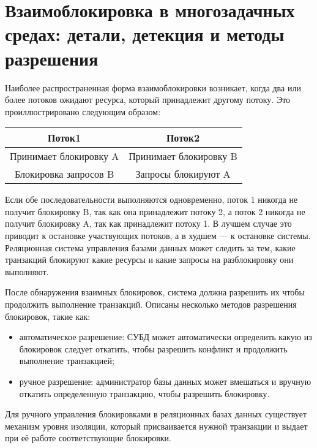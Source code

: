 \chapter{Взаимоблокировка в многозадачных средах: детали, детекция и методы разрешения}

Наиболее распространенная форма взаимоблокировки возникает, когда два или более потоков ожидают ресурса, который принадлежит другому потоку\cite{deadlock_detection}. Это проиллюстрировано следующим образом:
\FloatBarrier
\begin{table}[h]
	\renewcommand{\arraystretch}{1.8}
	\renewcommand{\tabcolsep}{0.1cm} 
	\begin{center}
		\begin{tabular}{|c|c|} 
			\hline
			Поток1 & Поток2 \\
			\hline
			Принимает блокировку A & Принимает блокировку B \\
			\hline 
			Блокировка запросов B & Запросы блокируют A \\
			\hline
		\end{tabular}
	\end{center}
\end{table}
\FloatBarrier
Если обе последовательности выполняются одновременно, поток 1 никогда не получит блокировку B, так как она принадлежит потоку 2, а поток 2 никогда не получит блокировку A, так как принадлежит потоку 1. В лучшем случае это приводит к остановке участвующих потоков, а в худшем — к остановке системы.
Реляционная система управления базами данных может следить за тем, какие транзакций блокируют какие ресурсы и какие запросы на разблокировку они выполняют.

После обнаружения взаимных блокировок, система должна разрешить их чтобы продолжить выполнение транзакций. Описаны несколько методов разрешения блокировок, такие как:
\begin{itemize}
	\item автоматическое разрешение: СУБД может автоматически определить какую из блокировок следует откатить, чтобы разрешить конфликт и продолжить выполнение транзакцией;
	\item ручное разрешение: администратор базы данных может вмешаться и вручную откатить определенную транзакцию, чтобы разрешить блокировку.
\end{itemize}

Для ручного управления блокировками в реляционных базах данных существует механизм уровня изоляции, который присваивается нужной транзакции и выдает при её работе соответствующие блокировки.

